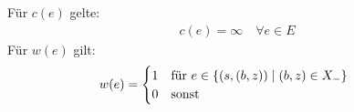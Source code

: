 \documentclass[a4paper]{article}
\begin{document}
Für $c(e)$ gelte:
\begin{align*}
	c(e) = \infty \quad \forall e \in E
\end{align*}
Für $w(e)$ gilt:
\begin{align*}
w(e) &= \begin{cases}
	1 \text{\quad für } e \in \{ (s, (b, z)) \mid (b, z) \in X_- \} \\
	0 \text{\quad sonst}
\end{cases}
\end{align*}
\end{document}
